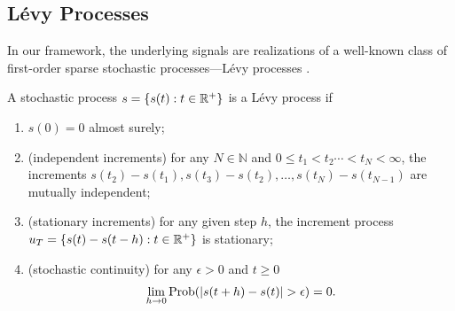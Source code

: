 \documentclass[journal]{IEEEtran}
\begin{document}
\subsection{L\'{e}vy Processes}
In our framework, the underlying signals are realizations of a well-known class of first-order sparse stochastic processes---L\'{e}vy processes \cite{ken1999levy,unser2014ssp}. 

\begin{definition}[L\'{e}vy process]
A stochastic process $s = \{s(t) : t \in \mathbb{R}^{+}\}$ is a L\'{e}vy process if
\begin{enumerate}
    \item $s(0) = 0$ almost surely;
    \item (independent increments) for any $N \in \mathbb{N}$ and $0 \leq t_1 < t_2 \cdots < t_N < \infty$, the increments $s(t_2)-s(t_1), s(t_3)-s(t_2), \ldots, s(t_N)-s(t_{N-1})$ are mutually independent;
    \item (stationary increments) for any given step $h$, the increment process $u_T = \{s(t) - s(t-h) : t \in \mathbb{R}^{+}\}$ is stationary;
    \item (stochastic continuity) for any $\epsilon > 0$ and $t \geq 0$
    \begin{equation*}
        \lim_{h \rightarrow 0} \textup{Prob}(|s(t+h)-s(t)| > \epsilon) = 0.
    \end{equation*}
\end{enumerate}
\end{definition}
\end{document}
